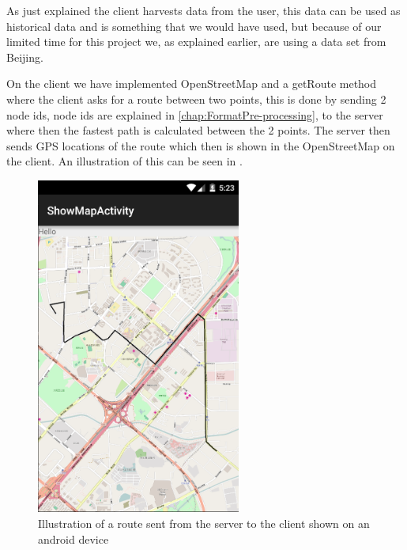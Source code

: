 As just explained the client harvests data from the user, this data can be used as historical data and is something that we would have used, but because of our limited time for this project we, as explained earlier, are using a data set from Beijing.

On the client we have implemented OpenStreetMap and a getRoute method where the client asks for a route between two points, this is done by sending 2 node ids, node ids are explained in \ref{chap:FormatPre-processing}, to the server where then the fastest path is calculated between the 2 points. The server then sends GPS locations of the route which then is shown in the OpenStreetMap on the client. An illustration of this can be seen in .

\begin{figure}[h!]
  \centering
    \includegraphics[width=0.6\textwidth]{figures/routeOnMap.png}
    \caption{Illustration of a route sent from the server to the client shown on an android device}
    \label{fig:routeonmap}
\end{figure}

